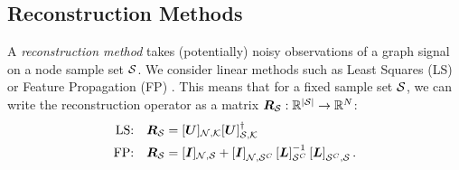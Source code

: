 \subsection{Reconstruction Methods}
A \emph{reconstruction method} takes (potentially) noisy observations of a graph signal on a node sample set $\mathcal{S}$.
We consider linear methods such as Least Squares (LS) or Feature Propagation (FP) \cite{rossi2021unreasonable}. This means that for a fixed sample set $\mathcal{S}$, we can write the reconstruction operator as a matrix $\bm{R}_{\mathcal{S}}:\mathbb{R}^{|\mathcal{S}|} \to \mathbb{R}^{N}$: %
    \begin{align}
    \textrm{LS:\quad} \matr{R}_{\set{S}} &= \matrsubU{N}\matrsubU{S}^{\dagger} \label{eq:defn_RS:LS}\\
    \textrm{FP:\quad} \matr{R}_{\set{S}} &= \matrsub[N,S]{I} + \msubgen[\set{N},\set{S}^{C}]{\matr{I}}\msubgen[\set{S}^{C}]{\matr{L}}^{-1}\msubgen[\set{S}^{C},\set{S}]{\matr{L}}.
    \end{align}

